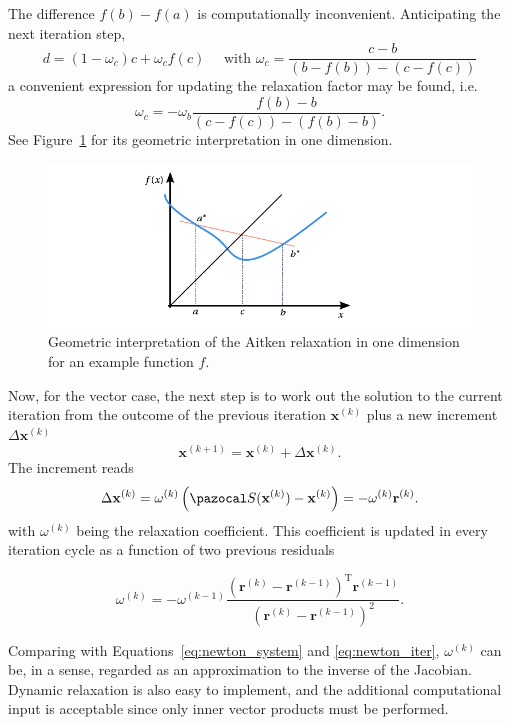 The difference \(f(b)-f(a)\) is computationally inconvenient.
Anticipating the next iteration step,
\begin{equation}
d=\left(1-\omega_{c}\right) c+\omega_{c} f(c) \quad \text { with } \omega_{c}=\frac{c-b}{\left(b-f(b)\right)-\left(c-f(c)\right)}
\end{equation}
a convenient expression for updating the relaxation factor may be found, i.e.
\begin{equation}
\omega_{c}=-\omega_{b}\frac{f(b)-b}{(c-f(c))-(f(b)-b)}.
\end{equation}
See Figure~\ref{fig:mod_aitken} for its geometric interpretation in one dimension.

\begin{figure}[htbp]
  \includegraphics{figures/mod_aitken}
  \caption{Geometric interpretation of the Aitken relaxation in one dimension for an example function \(f\).}
  \label{fig:mod_aitken}
\end{figure}

Now, for the vector case, the next step is to work out the solution to the current iteration from the outcome of the previous iteration $\mathbf{x}^{(k)}$ plus a new increment $\Delta \mathbf{x}^{(k)}$
\begin{equation}
\mathbf{x}^{(k+1)}=\mathbf{x}^{(k)}+\Delta \mathbf{x}^{(k)}.
\end{equation}
The increment reads
\begin{equation}
\Delta \mathbf{x}^{(k)}=\omega^{(k)}\left(\pazocal S(\mathbf{x}^{(k)})-\mathbf{x}^{(k)}\right)=-\omega^{(k)} \mathbf r^{(k)}.
\end{equation}
with $\omega^{(k)}$ being the relaxation coefficient.
This coefficient is updated in every iteration cycle as a function of two previous residuals
\begin{highlight}
  \begin{equation}
    \omega^{(k)}=-\omega^{(k-1)} \frac{\left(\mathbf{r}^{(k)}-\mathbf{r}^{(k-1)}\right)^{\mathrm{T}} \mathbf{r}^{(k-1)}}{\left(\mathbf{r}^{(k)}-\mathbf{r}^{(k-1)}\right)^{2}}.
  \end{equation}
\end{highlight}
Comparing with Equations~\eqref{eq:newton_system} and \eqref{eq:newton_iter}, \(\omega^{(k)}\) can be, in a sense, regarded as an approximation to the inverse of the Jacobian.
Dynamic relaxation is also easy to implement, and the additional computational input is acceptable since only inner vector products must be performed.

